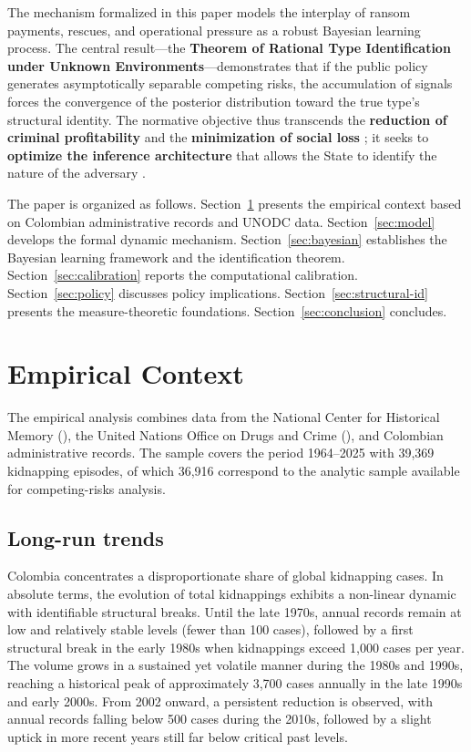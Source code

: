 \documentclass[12pt]{article}
\theoremstyle{definition}
\theoremstyle{remark}
\newcommand{\1}{\mathbf{1}}
\begin{document}
The mechanism formalized in this paper models the interplay of ransom payments, rescues, and operational pressure as a robust Bayesian learning process. The central result---the \textbf{Theorem of Rational Type Identification under Unknown Environments}---demonstrates that if the public policy generates asymptotically separable competing risks, the accumulation of signals forces the convergence of the posterior distribution toward the true type's structural identity. The normative objective thus transcends the \textbf{reduction of criminal profitability} and the \textbf{minimization of social loss} \parencite{Becker1968,Mejia2000Secuestro}; it seeks to \textbf{optimize the inference architecture} that allows the State to identify the nature of the adversary \parencite{Selten1977Kidnapping}.

The paper is organized as follows. Section~\ref{sec:empirical} presents the empirical context based on Colombian administrative records and UNODC data. Section~\ref{sec:model} develops the formal dynamic mechanism. Section~\ref{sec:bayesian} establishes the Bayesian learning framework and the identification theorem. Section~\ref{sec:calibration} reports the computational calibration. Section~\ref{sec:policy} discusses policy implications. Section~\ref{sec:structural-id} presents the measure-theoretic foundations. Section~\ref{sec:conclusion} concludes.

\section{Empirical Context}
\label{sec:empirical}

\noindent The empirical analysis combines data from the National Center for Historical Memory (\textcite{cnmh_datos}), the United Nations Office on Drugs and Crime (\textcite{unodc_Data}), and Colombian administrative records. The sample covers the period 1964--2025 with 39,369 kidnapping episodes, of which 36,916 correspond to the analytic sample available for competing-risks analysis.

\subsection{Long-run trends}

Colombia concentrates a disproportionate share of global kidnapping cases. In absolute terms, the evolution of total kidnappings exhibits a non-linear dynamic with identifiable structural breaks. Until the late 1970s, annual records remain at low and relatively stable levels (fewer than 100 cases), followed by a first structural break in the early 1980s when kidnappings exceed 1,000 cases per year. The volume grows in a sustained yet volatile manner during the 1980s and 1990s, reaching a historical peak of approximately 3,700 cases annually in the late 1990s and early 2000s. From 2002 onward, a persistent reduction is observed, with annual records falling below 500 cases during the 2010s, followed by a slight uptick in more recent years still far below critical past levels.
\end{document}
